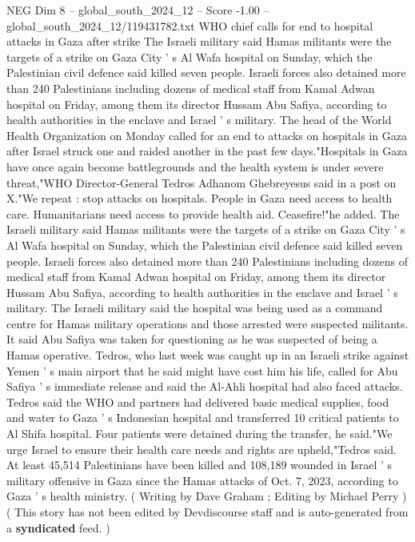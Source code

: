 \begin{textsample}{NEG Dim 8 – global\_south\_2024\_12 – Score -1.00 – global\_south\_2024\_12/119431782.txt}  \label{ex:f8_neg_384}
WHO chief calls for end to hospital attacks in Gaza after strike The Israeli military said Hamas militants were the targets of a strike on Gaza City ' s Al Wafa hospital on Sunday, which the Palestinian civil defence said killed seven people.
Israeli forces also detained more than 240 Palestinians including dozens of medical staff from Kamal Adwan hospital on Friday, among them its director Hussam Abu Safiya, according to health authorities in the enclave and Israel ' s military.
The head of the World Health Organization on Monday called for an end to attacks on hospitals in Gaza after Israel struck one and raided another in the past few days."Hospitals in Gaza have once again become battlegrounds and the health system is under severe threat,"WHO Director-General Tedros Adhanom Ghebreyesus said in a post on X."We repeat : stop attacks on hospitals.
People in Gaza need access to health care.
Humanitarians need access to provide health aid.
Ceasefire!"he added.
The Israeli military said Hamas militants were the targets of a strike on Gaza City ' s Al Wafa hospital on Sunday, which the Palestinian civil defence said killed seven people.
Israeli forces also detained more than 240 Palestinians including dozens of medical staff from Kamal Adwan hospital on Friday, among them its director Hussam Abu Safiya, according to health authorities in the enclave and Israel ' s military.
The Israeli military said the hospital was being used as a command centre for Hamas military operations and those arrested were suspected militants.
It said Abu Safiya was taken for questioning as he was suspected of being a Hamas operative.
Tedros, who last week was caught up in an Israeli strike against Yemen ' s main airport that he said might have cost him his life, called for Abu Safiya ' s immediate release and said the Al-Ahli hospital had also faced attacks.
Tedros said the WHO and partners had delivered basic medical supplies, food and water to Gaza ' s Indonesian hospital and transferred 10 critical patients to Al Shifa hospital.
Four patients were detained during the transfer, he said."We urge Israel to ensure their health care needs and rights are upheld,"Tedros said.
At least 45,514 Palestinians have been killed and 108,189 wounded in Israel ' s military offensive in Gaza since the Hamas attacks of Oct. 7, 2023, according to Gaza ' s health ministry. ( Writing by Dave Graham ; Editing by Michael Perry ) ( This story has not been edited by Devdiscourse staff and is auto-generated from a \textbf{syndicated} feed. )

\end{textsample}
